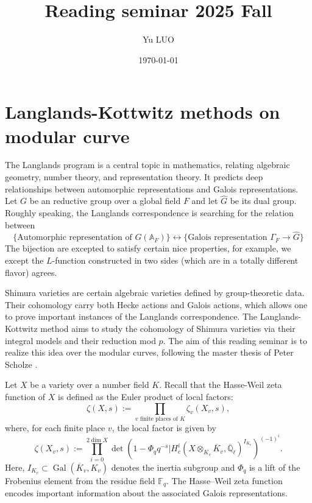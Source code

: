 \documentclass[a4paper, reqno]{amsart} %
\title{Reading seminar 2025 Fall}
\author{Yu LUO}
\date{\today}
\theoremstyle{definition}
\numberwithin{equation}{section}
\newcommand{\mbA}{\mathbb{A}}
\newcommand{\mbF}{\mathbb{F}}
\newcommand{\mbQ}{\mathbb{Q}}
\newcommand{\ov}{\overline}
\newcommand{\Gal}{\operatorname{Gal}}
\newcommand{\wh}{\widehat}
\begin{document}
\maketitle
		
\section{Langlands-Kottwitz methods on modular curve}
The Langlands program is a central topic in mathematics, relating algebraic geometry, number theory, and representation theory.
It predicts deep relationships between automorphic representations and Galois representations. Let $G$ be an reductive group over a global field $F$ and let $\wh{G}$ be its dual group. Roughly speaking, the Langlands correspondence is searching for the relation between
\begin{equation*}
\bigl\{
\text{Automorphic representation of $G(\mbA_F)$}
\bigr\}
\longleftrightarrow
\bigl\{
\text{Galois representation $\Gamma_F\to\wh{G}$}
\bigr\}
\end{equation*}
The bijection are excepted to satisfy certain nice properties, for example, we except the $L$-function constructed in two sides (which are in a totally different flavor) agrees.

Shimura varieties are certain algebraic varieties defined by group-theoretic data. Their cohomology carry both Hecke actions and Galois actions, which allows one to prove important instances of the Langlands correspondence. The Langlands-Kottwitz method \cite{Langlands77,Langlands79-1,Langlands79-2,Kottwitz92} aims to study the cohomology of Shimura varieties via their integral models and their reduction mod $p$. 
The aim of this reading seminar is to realize this idea over the modular curves, following the master thesis of Peter Scholze \cite{Scholze-MC}. 


Let $X$ be a variety over a number field $K$. Recall that the Hasse-Weil zeta function of $X$ is defined as the Euler product of local factors:
$$
\zeta(X,s):=\prod_{v\text{ finite places of }K}\zeta_v(X_v,s),
$$
where, for each finite place $v$, the local factor is given by
$$
\zeta(X_v,s):=\prod_{i=0}^{2\dim X}\det(1-\Phi_q q^{-s}|H^i_c(X\otimes_{K_v}\ov{K}_v,\ov{\mbQ}_\ell)^{I_{K_v}})^{(-1)^i}.
$$
Here, $I_{K_v}\subset \Gal(\ov{K}_v,K_v)$ denotes the inertia subgroup and $\Phi_q$ is a lift of the Frobenius element from the residue field $\mbF_q$. The Hasse–Weil zeta function encodes important information about the associated Galois representations.
\end{document}
